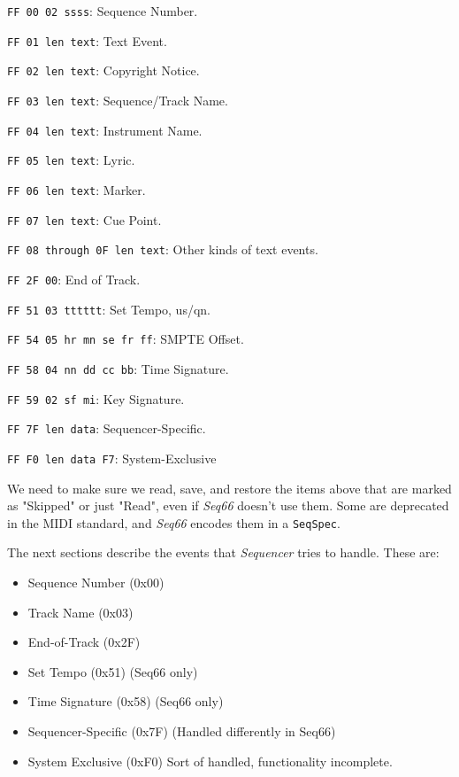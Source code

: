    \begin{enumber}
      \item \texttt{FF 00 02 ssss}: Sequence Number.
      \item \texttt{FF 01 len text}: Text Event.
      \item \texttt{FF 02 len text}: Copyright Notice.
      \item \texttt{FF 03 len text}: Sequence/Track Name.
      \item \texttt{FF 04 len text}: Instrument Name.
      \item \texttt{FF 05 len text}: Lyric.
      \item \texttt{FF 06 len text}: Marker.
      \item \texttt{FF 07 len text}: Cue Point.
      \item \texttt{FF 08 through 0F len text}: Other kinds of  text events.
      \item \texttt{FF 2F 00}: End of Track.
      \item \texttt{FF 51 03 tttttt}: Set Tempo, us/qn.
      \item \texttt{FF 54 05 hr mn se fr ff}: SMPTE Offset.
      \item \texttt{FF 58 04 nn dd cc bb}: Time Signature.
      \item \texttt{FF 59 02 sf mi}: Key Signature.
      \item \texttt{FF 7F len data}: Sequencer-Specific.
      \item \texttt{FF F0 len data F7}: System-Exclusive
   \end{enumber}

   We need to make sure we read, save, and restore the items above that are
   marked as "Skipped" or just "Read",
   even if \textsl{Seq66} doesn't use them.
   Some are deprecated in the MIDI
   standard, and \textsl{Seq66} encodes them in a \texttt{SeqSpec}.

   The next sections describe the events that \textsl{Sequencer} tries to
   handle.  These are:

   \begin{itemize}
      \item Sequence Number (0x00)
      \item Track Name (0x03)
      \item End-of-Track (0x2F)
      \item Set Tempo (0x51) (Seq66 only)
      \item Time Signature (0x58) (Seq66 only)
      \item Sequencer-Specific (0x7F) (Handled differently in Seq66)
      \item System Exclusive (0xF0) Sort of handled, functionality incomplete.
   \end{itemize}


